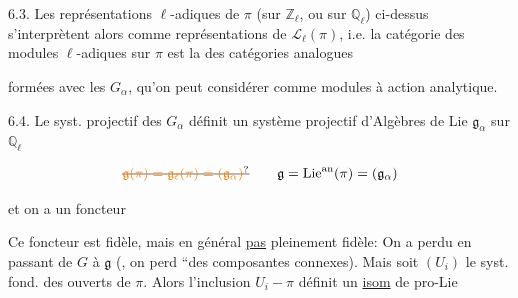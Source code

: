 6.3. Les représentations $\ell$-adiques de $\pi$ (sur $\mathbb Z_\ell$, ou sur $\mathbb Q_\ell$) ci-dessus s'interprètent alors comme représentations  de $\mathscr L_\ell(\pi)$, i.e. la catégorie des modules $\ell$-adiques sur $\pi$ est la  des catégories analogues

formées avec les $G_\alpha$, qu'on peut considérer comme modules à action analytique.

6.4. Le syst. projectif des $G_\alpha$ définit un système projectif d'Algèbres de Lie $\mathfrak g_\alpha$ sur $\mathbb Q_\ell$

\[
\deleted{\unsure{\mathfrak g(\pi)=\mathfrak g_\ell(\pi)=(\mathfrak g_\alpha)}}\qquad
\mathfrak g=\operatorname{Lie}^{\mathrm{an}}(\pi)=(\mathfrak g_\alpha)
\]

et on a un foncteur


Ce foncteur est fidèle, mais en général \uline{pas} pleinement fidèle: On a perdu en passant de  $G$ à $\mathfrak g$ (, on perd ``des composantes connexes). Mais soit $(U_i)$ le syst. fond. des  ouverts de $\pi$. Alors l'inclusion $U_i\mathbin{-}\pi$ définit un \uline{isom} de pro-Lie

